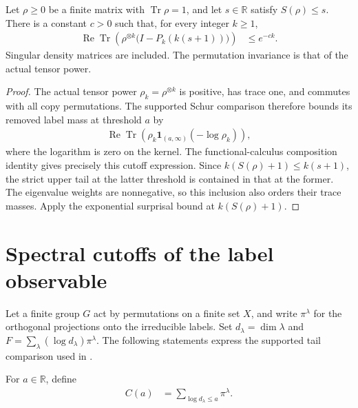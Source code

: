 \begin{theorem}
\label{thm:iid_schur_label_exponential}
\leanok
{}
Let $\rho\ge0$ be a finite matrix with $\operatorname{Tr}\rho=1$,
and let $s\in\mathbb R$ satisfy $S(\rho)\le s$. There is a constant
$c>0$ such that, for every integer $k\ge1$,
\begin{align}
 \operatorname{Re}\operatorname{Tr}\!\left(
   \rho^{\otimes k}\bigl(I-P_k(k(s+1))\bigr)\right)
 &\le e^{-ck}.
\end{align}
Singular density matrices are included. The permutation invariance is that of the actual tensor power.
\end{theorem}
\begin{proof}
\leanok
The actual tensor power $\rho_k=\rho^{\otimes k}$ is positive, has
trace one, and commutes with all copy permutations. The supported Schur
comparison therefore bounds its removed label mass at threshold $a$ by
\begin{align}
 \operatorname{Re}\operatorname{Tr}\!\left(
   \rho_k\mathbf1_{(a,\infty)}(-\log\rho_k)\right),
\end{align}
where the logarithm is zero on the kernel. The functional-calculus
composition identity gives precisely this cutoff expression. Since
$k(S(\rho)+1)\le k(s+1)$, the strict upper tail at the latter threshold
is contained in that at the former. The eigenvalue weights are
nonnegative, so this inclusion also orders their trace masses. Apply the
exponential surprisal bound at $k(S(\rho)+1)$.
\end{proof}

\section{Spectral cutoffs of the label observable}
\label{sec:schur_label_cutoffs}

Let a finite group $G$ act by permutations on a finite set $X$, and write
$\pi^\lambda$ for the orthogonal projections onto the irreducible labels.
Set $d_\lambda=\dim\lambda$ and
$F=\sum_\lambda(\log d_\lambda)\pi^\lambda$.
The following statements express the supported tail comparison used in
\cite[Section~7, upper comparisons]{OpenAI2026AreaLaw}.

\begin{definition}
    \label{def:schur_label_cutoff}
    \leanok
    For $a\in\mathbb R$, define
    \begin{align*}
        C(a) & =\sum_{\log d_\lambda\le a}\pi^\lambda.
    \end{align*}
\end{definition}

